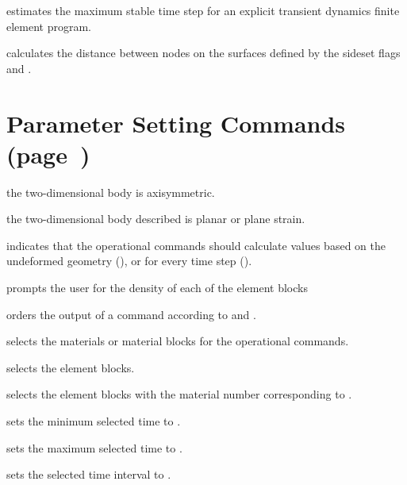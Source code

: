  {
estimates the maximum stable time step for an explicit transient
dynamics finite element program.
}

 {
calculates the distance between nodes on the surfaces defined
by the sideset flags  and .
}

\newpage
\section{Parameter Setting Commands (page~\protect\pageref{sec:param})}

 {
the two-dimensional body is axisymmetric.
}

 {
the two-dimensional body described is planar or plane strain.
}

 {
indicates that the operational commands should calculate values based on
the undeformed geometry (), or for every time step ().
}

 {
prompts the user for the density of each of the element blocks
}

 {
orders the output of a  command according to
 and .
}

 {
selects the materials or material blocks for the operational commands.
}

 {
selects the element blocks.
}

 {
selects the element blocks with the material number corresponding to
.
}

 {
sets the minimum selected time to .
}

 {
sets the maximum selected time to .
}

 {
sets the selected time interval to .
}

